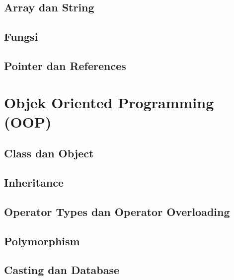 \documentclass[11pt,b5paper,oneside,titlepage]{book}
\begin{document}
	\chapter{Array dan String}\label{array-dan-string}
	
	
	\chapter{Fungsi}
	
	
	\chapter{Pointer dan References}\label{pointer-dan-references}
	
	\part{Objek Oriented Programming (OOP)}
	\chapter{Class dan Object}\label{class-dan-object}
	
	
	\chapter{Inheritance}\label{inheritance}
	
	
	\chapter{Operator Types dan Operator
		Overloading}\label{operator-types-dan-operator-overloading}
	
	
	\chapter{Polymorphism}\label{polymorphism}
	
	
	\chapter{Casting dan Database}\label{casting-dan-database}
	
	
	
\end{document}
